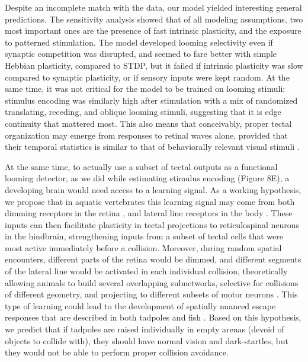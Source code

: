 \documentclass{article}
\begin{document}
Despite an incomplete match with the data, our model yielded interesting general predictions. The sensitivity analysis showed that of all modeling assumptions, two most important ones are the presence of fast intrinsic plasticity, and the exposure to patterned stimulation. The model developed looming selectivity even if synaptic competition was disrupted, and seemed to fare better with simple Hebbian plasticity, compared to STDP, but it failed if intrinsic plasticity was slow compared to synaptic plasticity, or if sensory inputs were kept random. At the same time, it was not critical for the model to be trained on looming stimuli: stimulus encoding was similarly high after stimulation with a mix of randomized translating, receding, and oblique looming stimuli, suggesting that it is edge continuity that mattered most. This also means that conceivably, proper tectal organization may emerge from responses to retinal waves alone, provided that their temporal statistics is similar to that of behaviorally relevant visual stimuli \citep{huberman2008waves}. %

At the same time, to actually use a subset of tectal outputs as a functional looming detector, as we did while estimating stimulus encoding (Figure 8E), a developing brain would need access to a learning signal. As a working hypothesis, we propose that in aquatic vertebrates this learning signal may come from both dimming receptors in the retina \citep{ishikane2005, baranauskas2012}, and lateral line receptors in the body \citep{pratt2009multisens, felch2016, truszkowski2017}. These inputs can then facilitate plasticity in tectal projections to reticulospinal neurons in the hindbrain, strengthening inputs from a subset of tectal cells that were most active immediately before a collision. Moreover, during random spatial encounters, different parts of the retina would be dimmed, and different segments of the lateral line would be activated in each individual collision, theoretically allowing animals to build several overlapping subnetworks, selective for collisions of different geometry, and projecting to different subsets of motor neurons \citep{frost2004review, helmbrecht2018topography}. This type of learning could lead to the development of spatially nuanced escape responses that are described in both tadpoles \citep{khakhalin2014} and fish \citep{bhattacharyya2017assessment}. Based on this hypothesis, we predict that if tadpoles are raised individually in empty arenas (devoid of objects to collide with), they should have normal vision and dark-startles, but they would not be able to perform proper collision avoidance.
\end{document}
